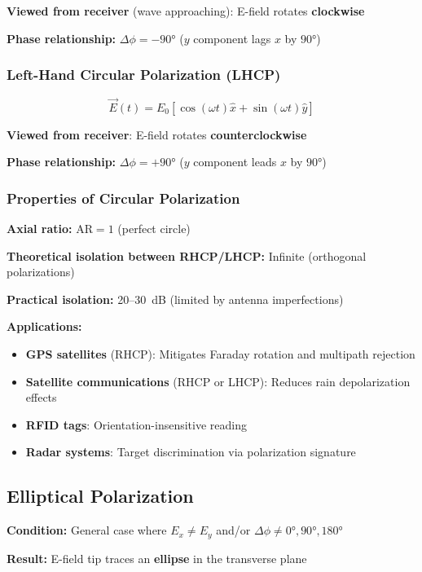 \textbf{Viewed from receiver} (wave approaching): E-field rotates \textbf{clockwise}

\textbf{Phase relationship:} $\Delta\phi = -90°$ ($y$ component lags $x$ by $90°$)

\subsubsection{Left-Hand Circular Polarization (LHCP)}
\begin{equation}
\vec{E}(t) = E_0[\cos(\omega t)\hat{x} + \sin(\omega t)\hat{y}]
\label{eq:lhcp}
\end{equation}

\textbf{Viewed from receiver}: E-field rotates \textbf{counterclockwise}

\textbf{Phase relationship:} $\Delta\phi = +90°$ ($y$ component leads $x$ by $90°$)

\subsubsection{Properties of Circular Polarization}

\textbf{Axial ratio:} $\mathrm{AR} = 1$ (perfect circle)

\textbf{Theoretical isolation between RHCP/LHCP:} Infinite (orthogonal polarizations)

\textbf{Practical isolation:} 20--30~dB (limited by antenna imperfections)

\textbf{Applications:}
\begin{itemize}
\item \textbf{GPS satellites} (RHCP): Mitigates Faraday rotation and multipath rejection
\item \textbf{Satellite communications} (RHCP or LHCP): Reduces rain depolarization effects
\item \textbf{RFID tags}: Orientation-insensitive reading
\item \textbf{Radar systems}: Target discrimination via polarization signature
\end{itemize}

\subsection{Elliptical Polarization}

\textbf{Condition:} General case where $E_x \neq E_y$ and/or $\Delta\phi \neq 0°, 90°, 180°$

\textbf{Result:} E-field tip traces an \textbf{ellipse} in the transverse plane

